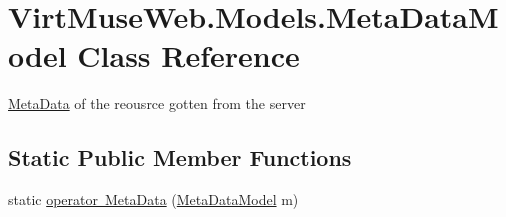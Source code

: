 \hypertarget{class_virt_muse_web_1_1_models_1_1_meta_data_model}{}\section{Virt\+Muse\+Web.\+Models.\+Meta\+Data\+Model Class Reference}
\label{class_virt_muse_web_1_1_models_1_1_meta_data_model}


\mbox{\hyperlink{class_meta_data}{Meta\+Data}} of the reousrce gotten from the server  


\subsection*{Static Public Member Functions}
\begin{DoxyCompactItemize}
\item 
static \mbox{\hyperlink{class_virt_muse_web_1_1_models_1_1_meta_data_model_a4a2ab308d80d527632efc545964d718a}{operator Meta\+Data}} (\mbox{\hyperlink{class_virt_muse_web_1_1_models_1_1_meta_data_model}{Meta\+Data\+Model}} m)
\end{DoxyCompactItemize}
